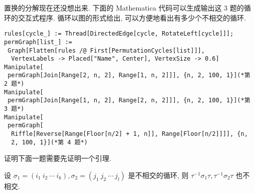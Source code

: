 \documentclass{ctexart}
\begin{document}
\begin{solution}
    置换的分解现在还没想出来. 下面的 Mathematica 代码可以生成输出这 3 题的循环的交互式程序. 循环以图的形式给出, 可以方便地看出有多少个不相交的循环.
\begin{verbatim}
rules[cycle_] := Thread[DirectedEdge[cycle, RotateLeft[cycle]]];
permGraph[list_] := 
 Graph[Flatten[rules /@ First[PermutationCycles[list]]], 
  VertexLabels -> Placed["Name", Center], VertexSize -> 0.6]
Manipulate[
 permGraph[Join[Range[2, n, 2], Range[1, n, 2]]], {n, 2, 100, 1}](*第 2 题*)
Manipulate[
 permGraph[Join[Range[1, n, 2], Range[2, n, 2]]], {n, 2, 100, 1}](*第 3 题*)
Manipulate[
 permGraph[
  Riffle[Reverse[Range[Floor[n/2] + 1, n]], Range[Floor[n/2]]]], {n, 
  2, 100, 1}](*第 4 题*)
\end{verbatim}
\end{solution}

证明下面一题需要先证明一个引理.
\begin{lemma}\label{l2.1}
    设 $\sigma_1=(i_1\ i_2\ \cdots\ i_k),\sigma_2=(j_1\ j_2\ \cdots\ j_l)$ 是不相交的循环, 则 $\tau^{-1}\sigma_1\tau,\tau^{-1}\sigma_2\tau$ 也不相交.
\end{lemma}
\end{document}
